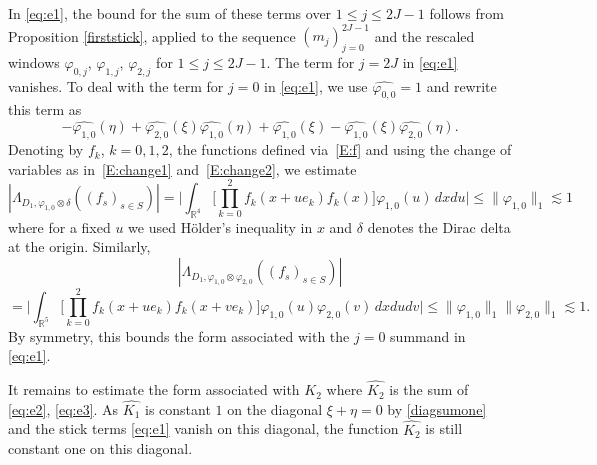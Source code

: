 \documentclass[12pt,reqno]{amsart}
\theoremstyle{plain}
\theoremstyle{definition}
\numberwithin{equation}{section}
\newcommand{\R}{{\mathbb R}}
\begin{document}
In \eqref{eq:e1}, the bound for the sum of these terms over $1\le j\le 2J-1$
follows from Proposition \ref{firststick}, applied to the
sequence $(m_j)_{j=0}^{2J-1}$ and the rescaled windows
$\varphi_{0,j}$, $\varphi_{1,j}$, $\varphi_{2,j}$
for $1\le j\le 2J-1$.
  The term for $j=2J$ in \eqref{eq:e1} vanishes.
To deal with the term for $j=0$ in \eqref{eq:e1}, we use $\widehat{\varphi_{0,0}}=1$ and rewrite this term as 
\[
-\widehat{\varphi_{1,0}}(\eta)  +\widehat{\varphi_{2,0}}(\xi)   \widehat{\varphi_{1,0}}(\eta) 
+\widehat{\varphi_{1,0}}(\xi) - \widehat{\varphi_{1,0}}(\xi) \widehat{\varphi_{2,0}}(\eta).  \]
Denoting by $f_k$, $k=0,1,2$, the functions defined via~\eqref{E:f} and using the change of variables as in~\eqref{E:change1} and~\eqref{E:change2},
we estimate
\[|\Lambda_{D_1, \varphi_{1,0}\otimes \delta}((f_s)_{s\in S})| = \Big| \int_{\R^4}  \Big[ \prod_{k=0}^2 f_k(x+ue_k)f_k(x) \Big] \varphi_{1,0}(u) \, dx du \Big| \leq \|\varphi_{1,0}\|_1  \lesssim 1\]
where for a fixed $u$ we used H\"older's inequality in $x$ and $\delta$ denotes the Dirac delta at the origin. 
Similarly, 
\[| \Lambda_{D_1, \varphi_{1,0}\otimes \varphi_{2,0}}((f_s)_{s\in S})| \]
\[= \Big| \int_{\R^5} \Big[ \prod_{k=0}^2 f_k(x+ue_k)f_k(x+ve_k) \Big] \varphi_{1,0}(u)\varphi_{2,0}(v) \,dxdudv\Big| \leq  \|\varphi_{1,0}\|_1  \|\varphi_{2,0}\|_1  \lesssim 1.\]
By symmetry, this bounds the form associated with the $j=0$ summand in \eqref{eq:e1}. 


It remains to estimate the form associated with $K_2$ where $\widehat{K_2}$ 
is the sum of \eqref{eq:e2}, \eqref{eq:e3}. 
As $\widehat{K_1}$ is constant $1$ on the diagonal $\xi+\eta=0$
by \eqref{diagsumone} and 
the stick terms {\eqref{eq:e1}} vanish on this diagonal, the function  $\widehat{K_2}$
is still constant one on this diagonal.
\end{document}
